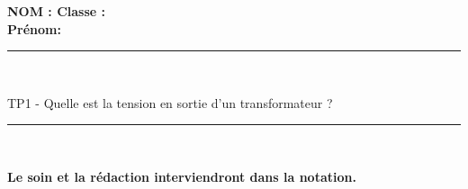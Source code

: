 \documentclass[11pt,a4paper]{article}
\begin{document}
\flushleft \textbf{NOM : \hfill Classe : \hspace{3cm} ~~\\[2mm]
Prénom:\\[0,4cm]
}
\hrule\
\\[0,2cm]

\begin{center}
 \LARGE{TP1 - Quelle est la tension en sortie d'un transformateur ? }
\end{center}

\vspace{3 mm}

\normalsize

\hrule\
\\[0,2cm]
   \begin{center}
   \textbf{Le soin et la rédaction interviendront dans la notation.}
   \end{center} 

\vfill 



  \\
\end{document}
